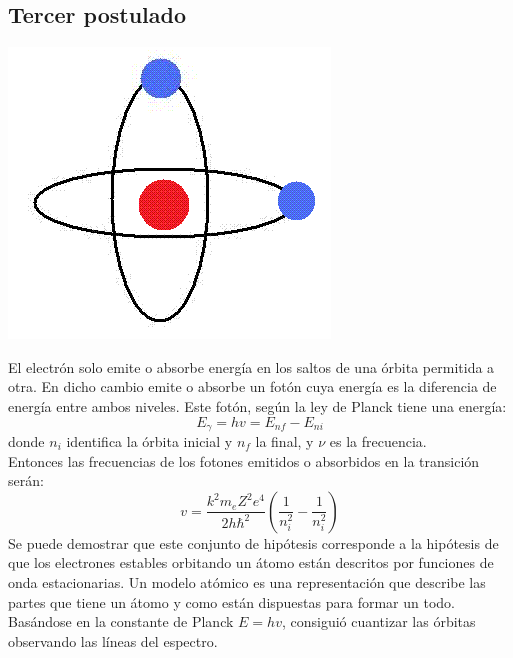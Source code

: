 \documentclass[12pt,a4paper]{article}
\begin{document}
\subsection*{Tercer postulado}

\begin{multicols}{2}

\begin{center}
\includegraphics[scale=0.5]{Bohr-model3pos.png} 
\end{center}
El electrón solo emite o absorbe energía en los saltos de una órbita permitida a otra. En dicho cambio emite o absorbe un fotón cuya energía es la diferencia de energía entre ambos niveles. Este fotón, según la ley de Planck tiene una energía: $$E_{\gamma}=hv=E_{nf}-E_{ni}$$ 
donde $n_i$ identifica la órbita inicial y $n_f$ la final, y $\nu$ es la frecuencia.\\
Entonces las frecuencias de los fotones emitidos o absorbidos en la transición serán:
$$v=\dfrac{k^{2}m_{e}Z^{2}e^{4}}{2h\hbar^{2}}\left( \dfrac{1}{n^{2}_i}-\dfrac{1}{n^{2}_{i}}\right)$$
Se puede demostrar que este conjunto de hipótesis corresponde a la hipótesis de que los electrones estables orbitando un átomo están descritos por funciones de onda estacionarias. Un modelo atómico es una representación que describe las partes que tiene un átomo y como están dispuestas para formar un todo. Basándose en la constante de Planck $E=hv$, consiguió cuantizar las órbitas observando las líneas del espectro.

\end{multicols}

\end{document}
